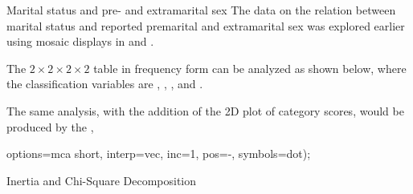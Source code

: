 \begin{Example}[marital3]{Marital status and pre- and extramarital sex}
The data on the relation between marital status and reported
premarital and extramarital sex was explored earlier using mosaic
displays in  and .

The $2\times 2 \times 2 \times 2$ table in frequency form can be
analyzed as shown below, where the classification variables are
, , , and .

The same analysis, with the addition of the 2D plot of
category scores, would be produced by the ,
\begin{listing}
   options=mca short, interp=vec, inc=1, pos=-, symbols=dot);
\end{listing}

\begin{Output}[htb]
\caption{Chi-Square Decomposition for Marital status MCA}\label{out:maritalmca1}
\begin{output}
                      Inertia and Chi-Square Decomposition


\end{output}
\end{Output}
\end{Example}
